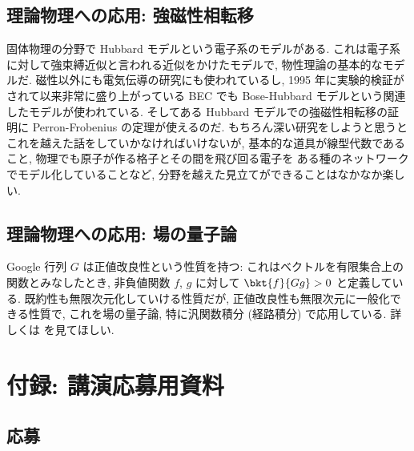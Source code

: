 \documentclass[openany, a4paper, oneside]{jsbook}
\begin{document}
\subsection{理論物理への応用: 強磁性相転移}

固体物理の分野で Hubbard モデルという電子系のモデルがある.
これは電子系に対して強束縛近似と言われる近似をかけたモデルで,
物性理論の基本的なモデルだ.
磁性以外にも電気伝導の研究にも使われているし,
1995 年に実験的検証がされて以来非常に盛り上がっている BEC でも Bose-Hubbard モデルという関連したモデルが使われている.
そしてある Hubbard モデルでの強磁性相転移の証明に Perron-Frobenius の定理が使えるのだ\cite{HalTasaki5}.
もちろん深い研究をしようと思うとこれを越えた話をしていかなければいけないが,
基本的な道具が線型代数であること, 物理でも原子が作る格子とその間を飛び回る電子を
ある種のネットワークでモデル化していることなど, 分野を越えた見立てができることはなかなか楽しい.
\subsection{理論物理への応用: 場の量子論}

Google 行列 $G$ は正値改良性という性質を持つ:
これはベクトルを有限集合上の関数とみなしたとき, 非負値関数 $f$, $g$ に対して $\bkt{f}{Gg} > 0$ と定義している.
既約性も無限次元化していける性質だが, 正値改良性も無限次元に一般化できる性質で,
これを場の量子論, 特に汎関数積分 (経路積分) で応用している.
詳しくは \cite{LorincziHiroshimaBetz1} を見てほしい.
\section{付録: 講演応募用資料}

\subsection{応募}
\end{document}
